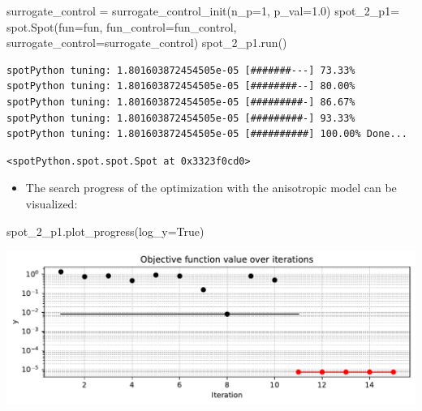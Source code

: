 \documentclass[
  letterpaper,
  DIV=11,
  numbers=noendperiod]{scrreprt}
\newenvironment{Shaded}{\begin{snugshade}}{\end{snugshade}}
\newcommand{\DecValTok}[1]{\textcolor[rgb]{0.68,0.00,0.00}{#1}}
\newcommand{\FloatTok}[1]{\textcolor[rgb]{0.68,0.00,0.00}{#1}}
\newcommand{\NormalTok}[1]{\textcolor[rgb]{0.00,0.23,0.31}{#1}}
\newcommand{\OperatorTok}[1]{\textcolor[rgb]{0.37,0.37,0.37}{#1}}
\newcommand{\VariableTok}[1]{\textcolor[rgb]{0.07,0.07,0.07}{#1}}
\providecommand{\tightlist}{%
  \setlength{\itemsep}{0pt}\setlength{\parskip}{0pt}}\usepackage{longtable,booktabs,array}
\begin{document}
\begin{Shaded}
\begin{Highlighting}[]
\NormalTok{surrogate\_control }\OperatorTok{=}\NormalTok{ surrogate\_control\_init(n\_p}\OperatorTok{=}\DecValTok{1}\NormalTok{,}
\NormalTok{                                           p\_val}\OperatorTok{=}\FloatTok{1.0}\NormalTok{)}
\NormalTok{spot\_2\_p1}\OperatorTok{=}\NormalTok{ spot.Spot(fun}\OperatorTok{=}\NormalTok{fun,}
\NormalTok{                    fun\_control}\OperatorTok{=}\NormalTok{fun\_control,}
\NormalTok{                    surrogate\_control}\OperatorTok{=}\NormalTok{surrogate\_control)}
\NormalTok{spot\_2\_p1.run()}
\end{Highlighting}
\end{Shaded}

\begin{verbatim}
spotPython tuning: 1.801603872454505e-05 [#######---] 73.33% 
spotPython tuning: 1.801603872454505e-05 [########--] 80.00% 
spotPython tuning: 1.801603872454505e-05 [#########-] 86.67% 
spotPython tuning: 1.801603872454505e-05 [#########-] 93.33% 
spotPython tuning: 1.801603872454505e-05 [##########] 100.00% Done...
\end{verbatim}

\begin{verbatim}
<spotPython.spot.spot.Spot at 0x3323f0cd0>
\end{verbatim}

\begin{itemize}
\tightlist
\item
  The search progress of the optimization with the anisotropic model can
  be visualized:
\end{itemize}

\begin{Shaded}
\begin{Highlighting}[]
\NormalTok{spot\_2\_p1.plot\_progress(log\_y}\OperatorTok{=}\VariableTok{True}\NormalTok{)}
\end{Highlighting}
\end{Shaded}

\includegraphics{015_num_spot_correlation_p_files/figure-pdf/cell-10-output-1.pdf}
\end{document}
